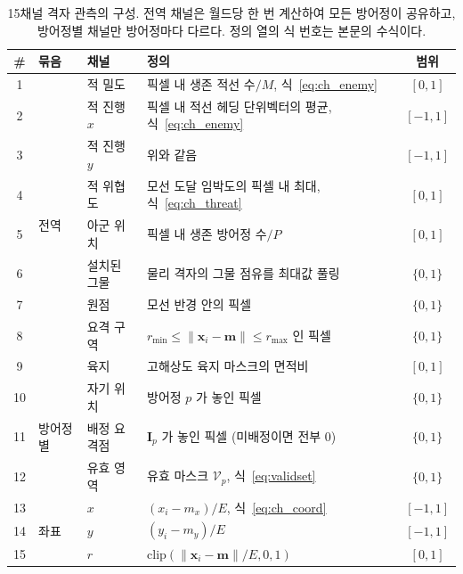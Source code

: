 \begin{table}[!tp]
\centering
\caption{15채널 격자 관측의 구성. 전역 채널은 월드당 한 번 계산하여 모든 방어정이 공유하고,
         방어정별 채널만 방어정마다 다르다. 정의 열의 식 번호는 본문의 수식이다.}
\label{tab:channels}
\footnotesize
\renewcommand{\arraystretch}{1.15}
\begin{tabular}{@{}clllc@{}}
\toprule
\# & 묶음 & 채널 & 정의 & 범위 \\
\midrule
1  & \multirow{9}{*}{전역}   & 적 밀도        & 픽셀 내 생존 적선 수$/M$, 식~\eqref{eq:ch_enemy}      & $[0,1]$ \\
2  &                         & 적 진행 $x$    & 픽셀 내 적선 헤딩 단위벡터의 평균, 식~\eqref{eq:ch_enemy} & $[-1,1]$ \\
3  &                         & 적 진행 $y$    & 위와 같음                                              & $[-1,1]$ \\
4  &                         & 적 위협도      & 모선 도달 임박도의 픽셀 내 최대, 식~\eqref{eq:ch_threat} & $[0,1]$ \\
5  &                         & 아군 위치      & 픽셀 내 생존 방어정 수$/P$                             & $[0,1]$ \\
6  &                         & 설치된 그물    & 물리 격자의 그물 점유를 최대값 풀링                     & $\{0,1\}$ \\
7  &                         & 원점           & 모선 반경 안의 픽셀                                    & $\{0,1\}$ \\
8  &                         & 요격 구역      & $r_{\min} \le \lVert \mathbf{x}_i - \mathbf{m} \rVert \le r_{\max}$ 인 픽셀 & $\{0,1\}$ \\
9  &                         & 육지           & 고해상도 육지 마스크의 면적비  & $[0,1]$ \\
\midrule
10 & \multirow{3}{*}{방어정별} & 자기 위치     & 방어정 $p$ 가 놓인 픽셀                                & $\{0,1\}$ \\
11 &                         & 배정 요격점    & $\mathbf{I}_p$ 가 놓인 픽셀 (미배정이면 전부 0)        & $\{0,1\}$ \\
12 &                         & 유효 영역      & 유효 마스크 $\mathcal{V}_p$, 식~\eqref{eq:validset}    & $\{0,1\}$ \\
\midrule
13 & \multirow{3}{*}{좌표}   & $x$            & $(x_i - m_x)/E$, 식~\eqref{eq:ch_coord}                & $[-1,1]$ \\
14 &                         & $y$            & $(y_i - m_y)/E$                                        & $[-1,1]$ \\
15 &                         & $r$            & $\mathrm{clip}(\lVert \mathbf{x}_i - \mathbf{m} \rVert / E, 0, 1)$ & $[0,1]$ \\
\bottomrule
\end{tabular}
\end{table}


